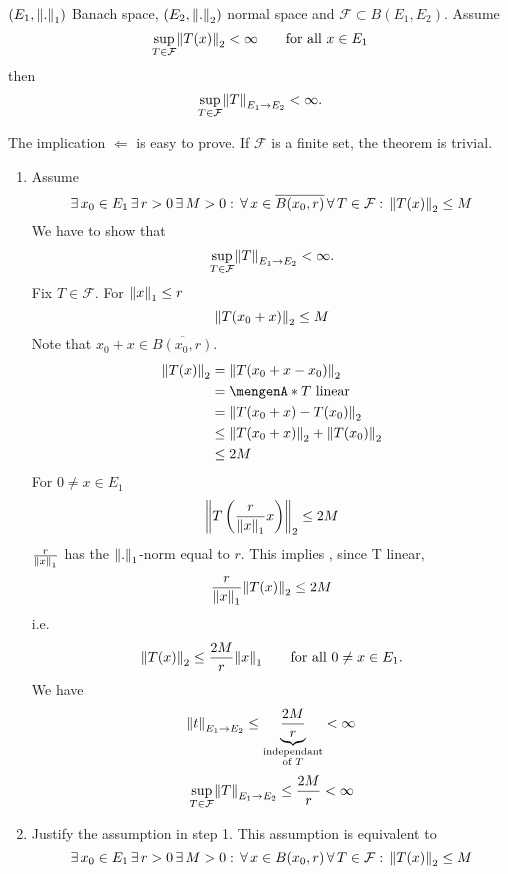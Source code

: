\begin{theorem*}
	$(E_1,\norm{.}_1)$ Banach space, $(E_2,\norm{.}_2)$ normal space and $\mathcal{F} \subset B(E_1,E_2)$. Assume
	\[
		\sup\limits_{T \in \mathcal{F}}\norm{T(x)}_2 < \infty \qquad \text{for all } x \in E_1
	\]
	then
	\[
		\sup\limits_{T \in \mathcal{F}}\norm{T}_{E_1 \to E_2} < \infty.
	\]
	\end{theorem*}
	\begin{bemerkung}
		The implication $\Leftarrow$ is easy to prove. If $\mathcal{F}$ is a finite set, the theorem is trivial.
	\end{bemerkung}
	\begin{beweis}
		\begin{enumerate}[step 1:]
			\item Assume 
			\[
				\exists\,x_0 \in E_1\, \exists\, r >0 \,\exists\, M>0: \,\forall\, x \in \overline{B(x_0,r)} \, \forall\,  T \in \mathcal{F}: \,\norm{T(x)}_2 \leq M
			\]
			We have to show that 
			\[
				\sup\limits_{T \in \mathcal{F}} \norm{T}_{E_1 \to E_2} < \infty.
			\]
			Fix $T \in \mathcal{F}$. For $\norm{x}_1 \leq r$
			\[
				\norm{T(x_0+x)}_2 \leq M
			\]
			Note that $x_0+x \in \overline{B(x_0,r)}$.
			\begin{align*}
				\norm{T(x)}_2 &= \norm{T(x_0+x-x_0)}_2 \\ &= \set{T \text{ linear}} \\ &= \norm{T(x_0 + x)-T(x_0)}_2 \\ &\leq \norm{T(x_0+x)}_2 +
				\norm{T(x_0)}_2 \\ &\leq 2M
			\end{align*}
			For $0 \neq x \in E_1$ 
			\[
				\norm{T \left( \frac{r}{\norm{x}_1} x \right)}_2 \leq 2M
			\]
			$\frac{r}{\norm{x}_1} $ has the $\norm{.}_1$-norm equal to $r$. This implies , since T linear,
			\[
				\frac{r}{\norm{x}_1} \norm{T(x)}_2 \leq 2M
			\]
			i.e.
			\[
				\norm{T(x)}_2 \leq \frac{2M}{r}\norm{x}_1 \qquad \text{for all }0 \neq x \in E_1.
			\]
			We have
			\[
				\norm{t}_{E_1 \to E_2} \leq \underset{\substack{\text{independant}\\ \text{of }T}}{\underbrace{\frac{2M}{r}}} < \infty
			\]
			\[
				\sup\limits_{T \in \mathcal{F}}\norm{T}_{E_1 \to E_2} \leq \frac{2M}{r} < \infty
			\]
			\item Justify the assumption in step 1. This assumption is equivalent to
			\[
			\exists\,x_0 \in E_1\, \exists\, r >0 \,\exists\, M>0: \,\forall\, x \in B(x_0,r) \, \forall\,  T \in \mathcal{F}: \,\norm{T(x)}_2 \leq M	
\]
\end{enumerate}
\end{beweis}
